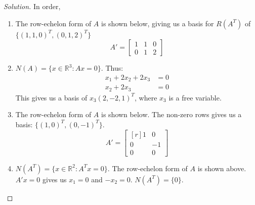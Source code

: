 \documentclass[oneside]{book}
\theoremstyle{mystyle}
\begin{document}
\begin{proof}[Solution] In order,
\begin{enumerate}[itemsep=0pt]
    \item The row-echelon form of $A$ is shown below, giving us a basis for $R(A^T)$ of $\{(1,1,0)^T,(0,1,2)^T\}$
        \begin{equation*}
            A'=\begin{bmatrix} 1 & 1 & 0 \\ 0 & 1 & 2 \end{bmatrix}    
        \end{equation*}
    \item $N(A) = \{x\in \mathbb{R}^3: Ax = 0\}$. Thus:
    \begin{align*}
        x_1 + 2x_2 + 2x_3 &= 0\\
        x_2 + 2x_3 &= 0
    \end{align*}
    This gives us a basis of $x_3(2,-2,1)^T$, where $x_3$ is a free variable.
    \item The row-echelon form of $A$ is shown below. The non-zero rows gives us a basis: $\{(1,0)^T, (0,-1)^T\}$.
        \begin{equation*}
            A'=\begin{bmatrix*}[r] 1 & 0 \\ 0 & -1 \\ 0 & 0 \end{bmatrix*}
        \end{equation*}
    \item $N(A^T)= \{x\in \mathbb{R}^2: A^T x = 0\}$. The row-echelon form of $A$ is shown above. $A'x = 0$ gives us $x_1 = 0$ and $-x_2 = 0$. $N(A^T) = \{0\}$.
\end{enumerate}
\end{proof}
\end{document}
